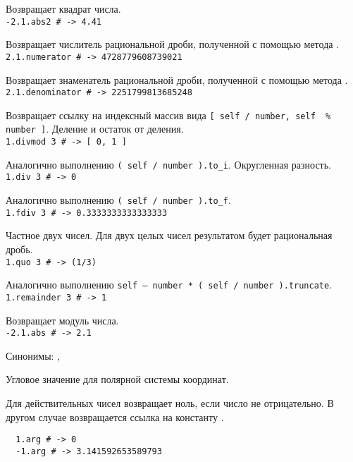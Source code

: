 \begin{methodlist}
  Возвращает квадрат числа.
  \\\verb!-2.1.abs2 # -> 4.41!

  Возвращает числитель рациональной дроби, полученной с помощью метода .
  \\\verb!2.1.numerator # -> 4728779608739021!

  Возвращает знаменатель рациональной дроби, полученной с помощью метода .
  \\\verb!2.1.denominator # -> 2251799813685248!

  Возвращает ссылку на индексный массив вида \verb![ self / number, self  % number ]!. Деление и остаток от деления.
  \\\verb!1.divmod 3 # -> [ 0, 1 ]!

  Аналогично выполнению \verb!( self / number ).to_i!. Округленная разность.
  \\\verb!1.div 3 # -> 0!

  Аналогично выполнению \verb!( self / number ).to_f!.
  \\\verb!1.fdiv 3 # -> 0.3333333333333333!

  Частное двух чисел. Для двух целых чисел результатом будет рациональная дробь.
  \\\verb!1.quo 3 # -> (1/3)!

  Аналогично выполнению \verb!self – number * ( self / number ).truncate!.
  \\\verb!1.remainder 3 # -> 1!

  Возвращает модуль числа.
  \\\verb!-2.1.abs # -> 2.1!

  Синонимы: , 

  Угловое значение для полярной системы координат.

  Для действительных чисел возвращает ноль, если число не отрицательно. В другом случае возвращается ссылка на константу .
  \begin{verbatim}
  1.arg # -> 0
  -1.arg # -> 3.141592653589793
  \end{verbatim}


\end{methodlist}

